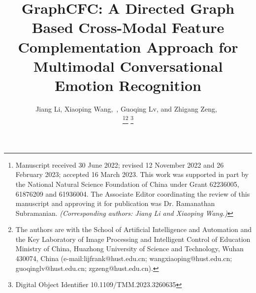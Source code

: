 \documentclass[lettersize,journal]{IEEEtran}
\begin{document}
\title{GraphCFC: A Directed Graph Based Cross-Modal Feature Complementation Approach for Multimodal Conversational Emotion Recognition}

\author{Jiang Li\hspace{-1.5mm}\orcidA{}, Xiaoping Wang\hspace{-1.5mm}\orcidB{},~, Guoqing Lv, and Zhigang Zeng\hspace{-1.5mm}\orcidC{},~\\
\thanks{Manuscript received 30 June 2022; revised 12 November 2022 and 26 February 2023; accepted 16 March 2023. This work was supported in part by the National Natural Science Foundation of China under Grant 62236005, 61876209 and 61936004. The Associate Editor coordinating the review of this manuscript and approving it for publication was Dr. Ramanathan Subramanian. \textit{(Corresponding authors: Jiang Li and Xiaoping Wang.)}}\thanks{The authors are with the School of Artificial Intelligence and Automation and the Key Laboratory of Image Processing and Intelligent Control of Education Ministry of China, Huazhong University of Science and Technology, Wuhan 430074, China (e-mail:lijfrank@hust.edu.cn; wangxiaoping@hust.edu.cn; guoqinglv@hust.edu.cn; zgzeng@hust.edu.cn).}
\thanks{Digital Object Identifier 10.1109/TMM.2023.3260635}}




\maketitle
\end{document}
